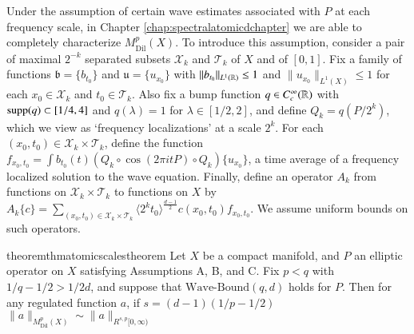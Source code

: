 Under the assumption of certain wave estimates associated with $P$ at each frequency scale, in Chapter \ref{chap:spectralatomicdchapter} we are able to completely characterize $M^p_{\text{Dil}}(X)$. To introduce this assumption, consider a pair of maximal $2^{-k}$ separated subsets $\mathcal{X}_k$ and $\mathcal{T}_k$ of $X$ and of $[0,1]$. Fix a family of functions $\mathfrak{b} = \{ b_{t_0} \}$ and $\mathfrak{u} = \{ u_{x_0} \}$ with $\| b_{t_0} \|_{L^1(\operatorname{\mathbb{R}})} \leq 1$ and $\| u_{x_0} \|_{L^1(X)} \leq 1$ for each $x_0 \in \mathcal{X}_k$ and $t_0 \in \mathcal{T}_k$. Also fix a bump function $q \in C_c^\infty(\operatorname{\mathbb{R}})$ with $\operatorname{\text{supp}}(q) \subset [1/4,4]$ and $q(\lambda) = 1$ for $\lambda \in [1/2,2]$, and define $Q_k = q(P/2^k)$, which we view as `frequency localizations' at a scale $2^k$. For each $(x_0,t_0) \in \mathcal{X}_k \times \mathcal{T}_k$, define the function $f_{x_0,t_0} = \int b_{t_0}(t) (Q_k \circ \cos(2 \pi i t P) \circ Q_k) \{ u_{x_0} \}$, a time average of a frequency localized solution to the wave equation. Finally, define an operator $A_k$ from functions on $\mathcal{X}_k \times \mathcal{T}_k$ to functions on $X$ by $A_k \{ c \} = \sum\nolimits_{(x_0,t_0) \in \mathcal{X}_k \times \mathcal{T}_k} \langle 2^k t_0 \rangle^{\frac{d-1}{2}} c(x_0,t_0) f_{x_0,t_0}$. We assume uniform bounds on such operators.

\vspace{0.5em}

\noindent {}

\vspace{0.4em}

\begin{restatable}{theorem}{thmatomicscalestheorem} \label{atomicscalestheorem}
  Let $X$ be a compact manifold, and $P$ an elliptic operator on $X$ satisfying Assumptions A, B, and C. Fix $p < q$ with $1/q - 1/2 > 1/2d$, and suppose that $\text{Wave-Bound}(q,d)$ holds for $P$. Then for any regulated function $a$, if $s = (d-1)(1/p - 1/2)$ $\| a \|_{M^p_{\text{Dil}}(X)} \sim \| a \|_{R^{s,p}[0,\infty)}$
\end{restatable}


